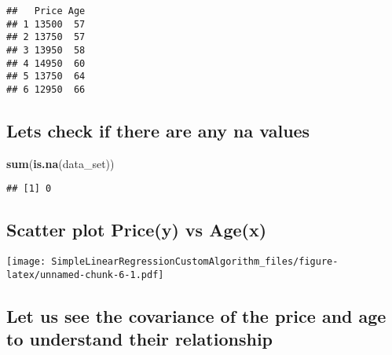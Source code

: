 \documentclass[]{article}
\newenvironment{Shaded}{\begin{snugshade}}{\end{snugshade}}
\newcommand{\DataTypeTok}[1]{\textcolor[rgb]{0.13,0.29,0.53}{#1}}
\newcommand{\KeywordTok}[1]{\textcolor[rgb]{0.13,0.29,0.53}{\textbf{#1}}}
\newcommand{\NormalTok}[1]{#1}
\newcommand{\OperatorTok}[1]{\textcolor[rgb]{0.81,0.36,0.00}{\textbf{#1}}}
\newcommand{\StringTok}[1]{\textcolor[rgb]{0.31,0.60,0.02}{#1}}
\begin{document}
\begin{verbatim}
##   Price Age
## 1 13500  57
## 2 13750  57
## 3 13950  58
## 4 14950  60
## 5 13750  64
## 6 12950  66
\end{verbatim}

\hypertarget{lets-check-if-there-are-any-na-values}{%
\subsection{Lets check if there are any na
values}\label{lets-check-if-there-are-any-na-values}}

\begin{Shaded}
\begin{Highlighting}[]
\KeywordTok{sum}\NormalTok{(}\KeywordTok{is.na}\NormalTok{(data_set))}
\end{Highlighting}
\end{Shaded}

\begin{verbatim}
## [1] 0
\end{verbatim}

\hypertarget{scatter-plot-pricey-vs-agex}{%
\subsection{Scatter plot Price(y) vs
Age(x)}\label{scatter-plot-pricey-vs-agex}}

\begin{Shaded}
\end{Shaded}

\texttt{[image: SimpleLinearRegressionCustomAlgorithm\_files/figure-latex/unnamed-chunk-6-1.pdf]}

\hypertarget{let-us-see-the-covariance-of-the-price-and-age-to-understand-their-relationship}{%
\subsection{Let us see the covariance of the price and age to understand
their
relationship}\label{let-us-see-the-covariance-of-the-price-and-age-to-understand-their-relationship}}
\end{document}
